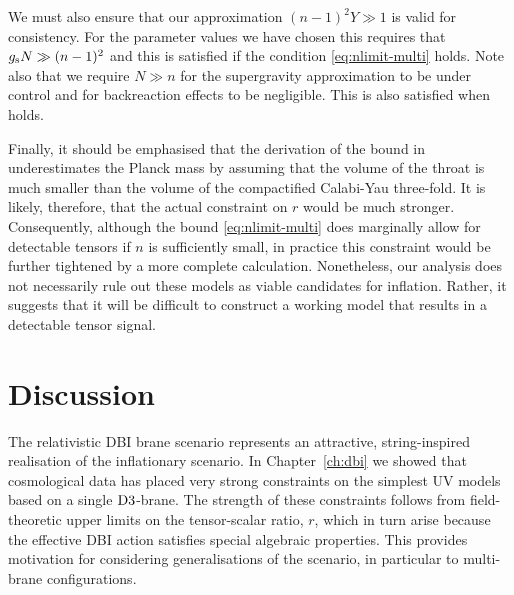 We must also ensure that our approximation $(n-1)^2Y \gg 1$ 
is valid for consistency.  
For the parameter values we have chosen this requires that 
$g_\mathrm{s} N \gg  (n-1)^2$ 
and this is satisfied if the condition \eqref{eq:nlimit-multi} 
holds. Note also that we require $N \gg n$ for the supergravity 
approximation to be under control and for backreaction effects to 
be negligible. This is also satisfied when   
holds. 


  


Finally, it should be emphasised that the derivation of the bound in
underestimates the Planck mass by assuming that 
the volume of the throat is much smaller 
than the volume of the compactified Calabi-Yau 
three-fold. It is likely, therefore, 
that the actual constraint on $r$ would be much stronger. Consequently, 
although the bound \eqref{eq:nlimit-multi}  
does marginally allow for detectable tensors if $n$ is sufficiently 
small, in practice this constraint would be further tightened by a more 
complete calculation. Nonetheless, our analysis does not necessarily 
rule out these models as viable candidates for inflation. Rather, it  
suggests that it will be difficult to construct a working model 
that results in a detectable tensor signal.   


% 
% 
% 
\section{Discussion}
\label{sec:disc-multi}


The relativistic DBI brane scenario represents an attractive, 
string-inspired realisation of the inflationary scenario. In
Chapter~\ref{ch:dbi} we showed that
cosmological data has placed very strong constraints on the simplest 
UV models based on a single ${\rm D3}$-brane. The strength 
of these constraints follows from field-theoretic upper limits 
on the tensor-scalar ratio, $r$, which in turn arise because 
the effective DBI action satisfies special  
algebraic properties. This provides motivation 
for considering generalisations of the scenario, in particular to 
multi-brane configurations. 


